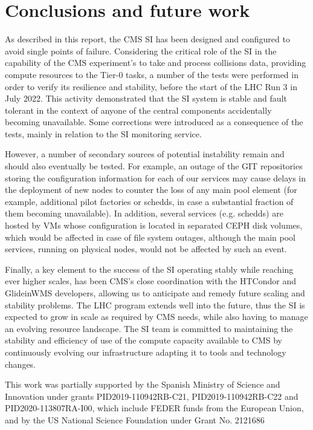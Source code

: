 \documentclass[a4paper]{jpconf}
\begin{document}
\section{Conclusions and future work}\label{sec:conclusions}
As described in this report, the CMS SI has been designed and configured to avoid single points of failure. Considering the critical role of the SI in the capability of the CMS experiment's to take and process collisions data, providing compute resources to the Tier-0 tasks, a number of the tests were performed in order to verify its resilience and stability, before the start of the LHC Run 3 in July 2022. This activity demonstrated that the SI system is stable and fault tolerant in the context of anyone of the central components accidentally becoming unavailable. Some corrections were introduced as a consequence of the tests, mainly in relation to the SI monitoring service.

However, a number of secondary sources of potential instability remain and should also eventually be tested. For example, an outage of the GIT repositories storing the configuration information for each of our services may cause delays in the deployment of new nodes to counter the loss of any main pool element (for example, additional pilot factories or schedds, in case a substantial fraction of them becoming unavailable). In addition, several services (e.g. schedds) are hosted by VMs whose configuration is located in separated CEPH disk volumes, which would be affected in case of file system outages, although the main pool services, running on physical nodes, would not be affected by such an event.

Finally, a key element to the success of the SI operating stably while reaching ever higher scales, has been CMS’s close coordination with the HTCondor and GlideinWMS developers, allowing us to anticipate and remedy future scaling and stability problems. The LHC program extends well into the future, thus the SI is expected to grow in scale as required by CMS needs, while also having to manage an evolving resource landscape. The SI team is committed to maintaining the stability and efficiency of use of the compute capacity available to CMS by continuously evolving our infrastructure adapting it to tools and technology changes.

\ack
This work was partially supported by the Spanish Ministry of Science and Innovation under grants PID2019-110942RB-C21, PID2019-110942RB-C22 and PID2020-113807RA-I00, which include FEDER funds from the European Union, and by the US National Science Foundation under Grant No. 2121686
\end{document}
